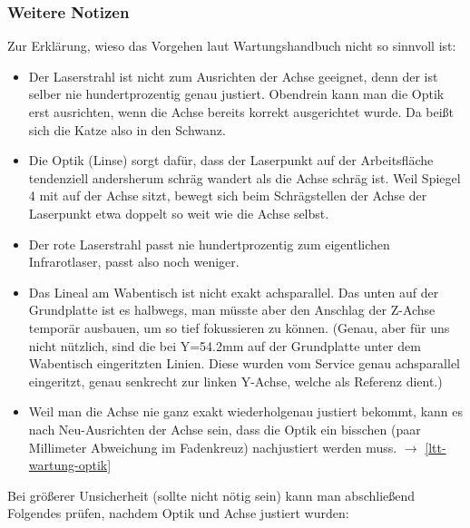 \documentclass{\basedir/fablab-document}
\begin{document}
	\subsubsection*{Weitere Notizen}
	Zur Erklärung, wieso das Vorgehen laut Wartungshandbuch nicht so sinnvoll ist:
	\begin{itemize}
		\item Der Laserstrahl ist nicht zum Ausrichten der Achse geeignet, denn der ist selber nie hundertprozentig genau justiert. Obendrein kann man die Optik erst ausrichten, wenn die Achse bereits korrekt ausgerichtet wurde. Da beißt sich die Katze also in den Schwanz.

		\item Die Optik (Linse) sorgt dafür, dass der Laserpunkt auf der Arbeitsfläche tendenziell andersherum schräg wandert als die Achse schräg ist. Weil Spiegel 4 mit auf der Achse sitzt, bewegt sich beim Schrägstellen der Achse der Laserpunkt etwa doppelt so weit wie die Achse selbst.

		\item Der rote Laserstrahl passt nie hundertprozentig zum eigentlichen Infrarotlaser, passt also noch weniger.

		\item Das Lineal am Wabentisch ist nicht exakt achsparallel. Das unten auf der Grundplatte ist es halbwegs, man müsste aber den Anschlag der Z-Achse temporär ausbauen, um so tief fokussieren zu können. (Genau, aber für uns nicht nützlich, sind die bei Y=54.2mm auf der Grundplatte unter dem Wabentisch eingeritzten Linien. Diese wurden vom Service genau achsparallel eingeritzt, genau senkrecht zur linken Y-Achse, welche als Referenz dient.)

		\item Weil man die Achse nie ganz exakt wiederholgenau justiert bekommt, kann es nach Neu-Ausrichten der Achse sein, dass die Optik ein bisschen (paar Millimeter Abweichung im Fadenkreuz) nachjustiert werden muss. $\rightarrow$ \cref{ltt-wartung-optik}
	\end{itemize}

	Bei größerer Unsicherheit (sollte nicht nötig sein) kann man abschließend Folgendes prüfen, nachdem Optik und Achse justiert wurden:
\end{document}
